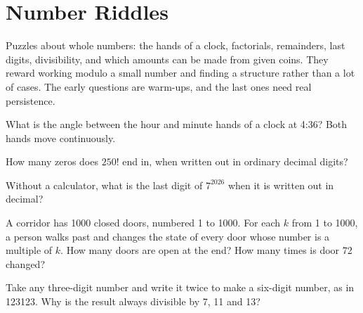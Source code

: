 \chapter{Number Riddles}\label{ch:iv1:number-riddles}

\begin{ivtrains}
Puzzles about whole numbers: the hands of a clock, factorials, remainders, last digits, divisibility, and which amounts can be made from given coins. They reward working modulo a small number and finding a structure rather than a lot of cases. The early questions are warm-ups, and the last ones need real persistence.
\end{ivtrains}

\begin{question}\label{iq:iv1:number-riddles:1}
What is the angle between the hour and minute hands of a clock at 4:36? Both hands move continuously.
\end{question}

\begin{question}\label{iq:iv1:number-riddles:2}
How many zeros does $250!$ end in, when written out in ordinary decimal digits?
\end{question}

\begin{question}\label{iq:iv1:number-riddles:3}
Without a calculator, what is the last digit of $7^{2026}$ when it is written out in decimal?
\end{question}

\begin{question}\label{iq:iv1:number-riddles:4}
A corridor has 1000 closed doors, numbered 1 to 1000. For each $k$ from 1 to 1000, a person walks past and changes the state of every door whose number is a multiple of $k$. How many doors are open at the end? How many times is door 72 changed?
\end{question}

\begin{question}\label{iq:iv1:number-riddles:5}
Take any three-digit number and write it twice to make a six-digit number, as in 123123. Why is the result always divisible by 7, 11 and 13?
\end{question}

